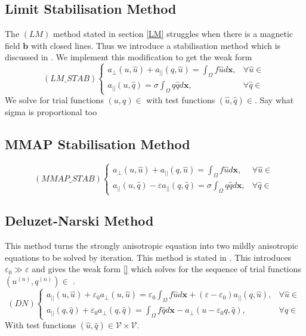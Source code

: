 \documentclass[12pt,a4paper]{article}
\begin{document}
\subsection{Limit Stabilisation Method} \label{LM_STAB}
The $(LM)$ method stated in section \ref{LM} struggles when there is a magnetic field $\mathbf{b}$ with closed lines. Thus we introduce a stabilisation method which is discussed in \cite{}. We implement this modification to get the weak form
\begin{equation}
(LM\_STAB)
\begin{cases}
a_{\perp}(u, \hat{u}) + a_{||}(q, \hat{u}) = \int_{\Omega} f \hat{u} d\mathbf{x}, 
&\forall \hat{u} \in \\
a_{||}(u, \hat{q}) = \sigma \int_{\Omega} q \hat{q} d\mathbf{x}, & \forall \hat{q} \in 
\end{cases}
\end{equation}
We solve for trial functions $(u, q) \in $ with test functions $(\hat{u}, \hat{q}) \in $. Say what sigma is proportional too

\subsection{MMAP Stabilisation Method} \label{MMAP_STAB}
\begin{equation}
(MMAP\_STAB)
\begin{cases}
a_{\perp}(u, \hat{u}) + a_{||}(q, \hat{u}) = \int_{\Omega} f \hat{u} d\mathbf{x}, 
&\forall \hat{u} \in \\
a_{||}(u, \hat{q}) - \varepsilon a_{||}(q, \hat{q}) = \sigma \int_{\Omega} q \hat{q} d\mathbf{x}, & \forall \hat{q}\in 
\end{cases}
\end{equation}

\subsection{Deluzet-Narski Method} \label{DN}
This method turns the strongly anisotropic equation into two mildly anisotropic equations to be solved by iteration. This method is stated in \cite{}. This introduces $\varepsilon_0 \gg \varepsilon$ and gives the weak form \ref{} which solves for the sequence of trial functions $(u^{(n)}, q^{(n)}) \in $ .
 \begin{equation}
 (DN)
   \begin{cases}
  a_{||}(u, \hat{u}) + \varepsilon_0 a_{\perp}(u, \hat{u}) = 
  \varepsilon_0 \int_{\Omega} f \hat{u} d\mathbf{x}
  +(\varepsilon-\varepsilon_0)a_{||}(q, \hat{u}),
  & \forall \hat{u} \in \\
  a_{||}(q, \hat{q}) + \varepsilon_0 a_{\perp}(q, \hat{q}) = 
  \int_{\Omega} f \hat{q} d\mathbf{x}
  -a_{\perp}(u - \varepsilon_0 q, \hat{q}),
  & \forall \hat{q} \in 
  \end{cases}
  \end{equation}
With test functions $(\hat{u}, \hat{q}) \in \mathcal{V} \times \mathcal{V}$.
\end{document}
